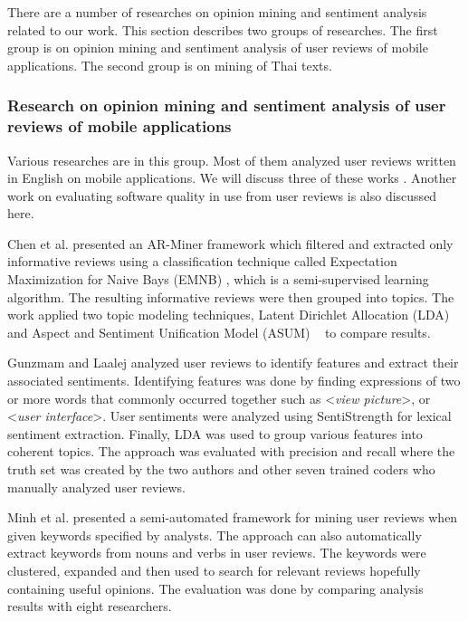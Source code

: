 There are a number of researches on opinion mining and sentiment analysis related to our work. This section describes two groups of researches. The first group is on opinion mining and sentiment analysis of user reviews of mobile applications. The second group is on mining of Thai texts. 

\subsubsection{Research on opinion mining and sentiment analysis of user reviews of mobile applications} Various researches are in this group. Most of them analyzed user reviews written in English on mobile applications. We will discuss three of these works \cite{ar-miner,userslikefeature,keywordmining}. Another work on evaluating software quality in use from user reviews \cite{leopairote2} is also discussed here.

Chen et al.\cite{ar-miner} presented an AR-Miner framework which filtered and extracted only informative reviews using a classification technique called Expectation Maximization for Naive Bays (EMNB) \cite{EMNB}, which is a semi-supervised learning algorithm. The resulting informative reviews were then grouped into topics. The work applied two topic modeling techniques, Latent Dirichlet Allocation (LDA) \cite{LDA} and Aspect and Sentiment Unification Model (ASUM) ~\cite{asum} to compare results.

Gunzmam and Laalej \cite{userslikefeature} analyzed user reviews to identify features and extract their associated sentiments. Identifying features was done by finding expressions of two or more words that commonly occurred together such as <\textit{view picture}>, or <\textit{user interface}>. User sentiments were analyzed using SentiStrength \cite{SentiStrength} for lexical sentiment extraction. Finally, LDA was used to group various features into coherent topics. The approach was evaluated with precision and recall where the truth set was created by the two authors and other seven trained coders who manually analyzed user reviews. 

Minh et al. \cite{keywordmining} presented a semi-automated framework for mining user reviews when given keywords specified by analysts. The approach can also automatically extract keywords from nouns and verbs in user reviews. The keywords were clustered, expanded and then used to search for relevant reviews hopefully containing useful opinions. The evaluation was done by comparing analysis results with eight researchers.


